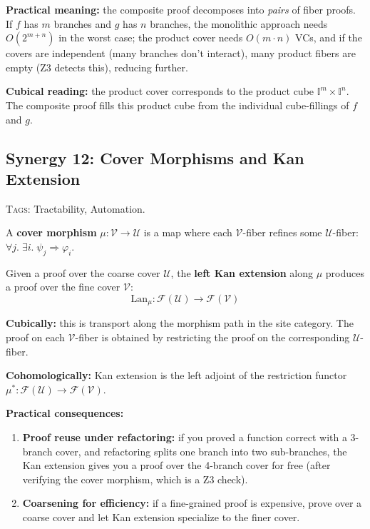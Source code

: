 \documentclass[11pt,a4paper]{article}
\theoremstyle{definition}
\theoremstyle{plain}
\newcommand{\covers}{\mathcal{U}}
\newcommand{\presheaf}{\mathcal{F}}
\newcommand{\interval}{\mathbb{I}}
\begin{document}
\textbf{Practical meaning:} the composite proof decomposes into
\emph{pairs} of fiber proofs.  If $f$ has $m$ branches and $g$
has $n$ branches, the monolithic approach needs $O(2^{m+n})$ in the
worst case; the product cover needs $O(m \cdot n)$ VCs, and if the
covers are independent (many branches don't interact), many product
fibers are empty (Z3 detects this), reducing further.

\textbf{Cubical reading:} the product cover corresponds to the
product cube $\interval^m \times \interval^n$.  The composite
proof fills this product cube from the individual cube-fillings
of $f$ and $g$.


\subsection{Synergy 12: Cover Morphisms and Kan Extension}
\label{sec:syn-kan}

\textsc{Tags:} Tractability, Automation.

\medskip\noindent
A \textbf{cover morphism} $\mu : \mathcal{V} \to \covers$ is a map
where each $\mathcal{V}$-fiber refines some $\covers$-fiber:
$\forall j.\;\exists i.\;\psi_j \Rightarrow \varphi_i$.

Given a proof over the coarse cover $\covers$, the \textbf{left Kan
extension} along $\mu$ produces a proof over the fine cover
$\mathcal{V}$:
\[
  \mathrm{Lan}_\mu : \presheaf(\covers) \to \presheaf(\mathcal{V})
\]

\textbf{Cubically:} this is transport along the morphism path in the
site category.  The proof on each $\mathcal{V}$-fiber is obtained by
restricting the proof on the corresponding $\covers$-fiber.

\textbf{Cohomologically:} Kan extension is the left adjoint of the
restriction functor $\mu^* : \presheaf(\covers) \to \presheaf(\mathcal{V})$.

\textbf{Practical consequences:}
\begin{enumerate}
\item \textbf{Proof reuse under refactoring:} if you proved a
  function correct with a 3-branch cover, and refactoring splits
  one branch into two sub-branches, the Kan extension gives you a
  proof over the 4-branch cover for free (after verifying the cover
  morphism, which is a Z3 check).
\item \textbf{Coarsening for efficiency:} if a fine-grained proof
  is expensive, prove over a coarse cover and let Kan extension
  specialize to the finer cover.
\end{enumerate}
\end{document}
